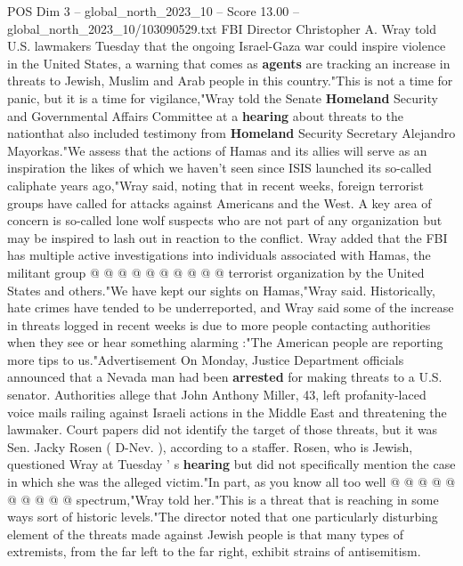 \begin{textsample}{POS Dim 3 – global\_north\_2023\_10 – Score 13.00 – global\_north\_2023\_10/103090529.txt}  \label{ex:f3_pos_204}
FBI Director Christopher A.
Wray told U.S. lawmakers Tuesday that the ongoing Israel-Gaza war could inspire violence in the United States, a warning that comes as \textbf{agents} are tracking an increase in threats to Jewish, Muslim and Arab people in this country."This is not a time for panic, but it is a time for vigilance,"Wray told the Senate \textbf{Homeland} Security and Governmental Affairs Committee at a \textbf{hearing} about threats to the nationthat also included testimony from \textbf{Homeland} Security Secretary Alejandro Mayorkas."We assess that the actions of Hamas and its allies will serve as an inspiration the likes of which we haven't seen since ISIS launched its so-called caliphate years ago,"Wray said, noting that in recent weeks, foreign terrorist groups have called for attacks against Americans and the West.
A key area of concern is so-called lone wolf suspects who are not part of any organization but may be inspired to lash out in reaction to the conflict.
Wray added that the FBI has multiple active investigations into individuals associated with Hamas, the militant group @ @ @ @ @ @ @ @ @ @ terrorist organization by the United States and others."We have kept our sights on Hamas,"Wray said.
Historically, hate crimes have tended to be underreported, and Wray said some of the increase in threats logged in recent weeks is due to more people contacting authorities when they see or hear something alarming :"The American people are reporting more tips to us."Advertisement On Monday, Justice Department officials announced that a Nevada man had been \textbf{arrested} for making threats to a U.S. senator.
Authorities allege that John Anthony Miller, 43, left profanity-laced voice mails railing against Israeli actions in the Middle East and threatening the lawmaker.
Court papers did not identify the target of those threats, but it was Sen.
Jacky Rosen ( D-Nev. ), according to a staffer.
Rosen, who is Jewish, questioned Wray at Tuesday ' s \textbf{hearing} but did not specifically mention the case in which she was the alleged victim."In part, as you know all too well @ @ @ @ @ @ @ @ @ @ spectrum,"Wray told her."This is a threat that is reaching in some ways sort of historic levels."The director noted that one particularly disturbing element of the threats made against Jewish people is that many types of extremists, from the far left to the far right, exhibit strains of antisemitism.

\end{textsample}
